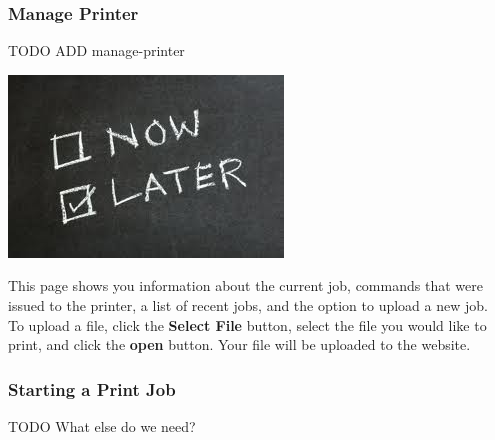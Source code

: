   \subsubsection{Manage Printer}
TODO ADD manage-printer
      \begin{center}
      \includegraphics[scale=1]{images/Now-Later.png}
    \end{center}
      This page shows you information about the current job, commands that were issued to the printer, a list of recent
      jobs, and the option to upload a new job.\\
      To upload a file, click the \textbf{Select File} button, select the file you would like
      to print, and click the \textbf{open} button.  Your file will be uploaded to the website.\\


  \subsubsection{Starting a Print Job}

TODO What else do we need?

